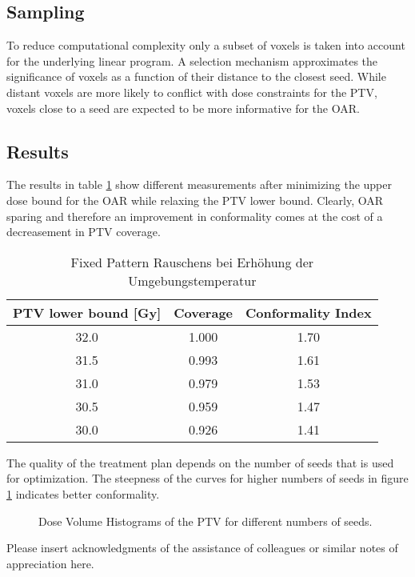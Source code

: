 \documentclass[USenglish,twocolumn]{article}
\begin{document}
	\subsection{Sampling}
		To reduce computational complexity only a subset of voxels is taken into account for the underlying linear program. A selection mechanism approximates the significance of voxels as a function of their distance to the closest seed.
		While distant voxels are more likely to conflict with dose constraints for the PTV, voxels close to a seed are expected to be more informative for the OAR.  
	
	\subsection{Results}
		The results in table \ref{table:LPSW_results} show different measurements after minimizing the upper dose bound for the OAR while relaxing the PTV lower bound. Clearly, OAR sparing and therefore an improvement in conformality comes at the cost of a decreasement in PTV coverage.
		\begin{table}[ht]
			\centering		
		 	\caption{Fixed Pattern Rauschens bei Erhöhung der Umgebungstemperatur}
		 	\label{table:LPSW_results}
			\begin{tabular}{ccc}
				PTV lower bound [Gy] 	& Coverage 	& Conformality Index\\	\hline
				32.0 					& 1.000		& 1.70\\
				31.5 					& 0.993 	& 1.61\\
				31.0 					& 0.979 	& 1.53\\
				30.5 					& 0.959 	& 1.47\\
				30.0 					& 0.926		& 1.41\\		
			\end{tabular}
		\end{table}	
		
		The quality of the treatment plan depends on the number of seeds that is used for optimization.
		The steepness of the curves for higher numbers of seeds in figure \ref{fig:LPSW_DVH_numberOfSeeds} indicates better conformality.
		\begin{figure}[ht]
			\centering
			 
			\caption{Dose Volume Histograms of the PTV for different numbers of seeds.}
			\label{fig:LPSW_DVH_numberOfSeeds}
		\end{figure}


\begin{acknowledgement}
Please insert acknowledgments of the assistance of colleagues or similar notes of appreciation here.
\end{acknowledgement}
\end{document}
